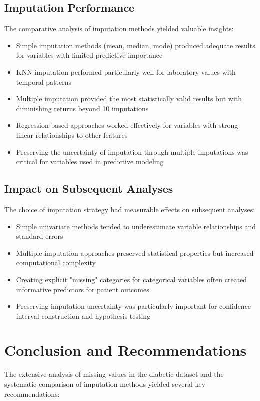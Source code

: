 \subsection{Imputation Performance}
The comparative analysis of imputation methods yielded valuable insights:
\begin{itemize}
    \item Simple imputation methods (mean, median, mode) produced adequate results for variables with limited predictive importance
    \item KNN imputation performed particularly well for laboratory values with temporal patterns
    \item Multiple imputation provided the most statistically valid results but with diminishing returns beyond 10 imputations
    \item Regression-based approaches worked effectively for variables with strong linear relationships to other features
    \item Preserving the uncertainty of imputation through multiple imputations was critical for variables used in predictive modeling
\end{itemize}

\subsection{Impact on Subsequent Analyses}
The choice of imputation strategy had measurable effects on subsequent analyses:
\begin{itemize}
    \item Simple univariate methods tended to underestimate variable relationships and standard errors
    \item Multiple imputation approaches preserved statistical properties but increased computational complexity
    \item Creating explicit "missing" categories for categorical variables often created informative predictors for patient outcomes
    \item Preserving imputation uncertainty was particularly important for confidence interval construction and hypothesis testing
\end{itemize}

\section{Conclusion and Recommendations}
\label{sec:conclusion}

The extensive analysis of missing values in the diabetic dataset and the systematic comparison of imputation methods yielded several key recommendations:

